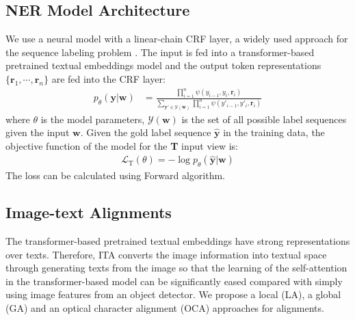 \documentclass[11pt]{article}
\newcommand{\mcL}{\mathcal{L}}
\def\vr{{\bm{r}}}
\def\vw{{\bm{w}}}
\def\vy{{\bm{y}}}
\begin{document}
\subsection{NER Model Architecture}
We use a neural model with a linear-chain CRF layer, a widely used approach for the sequence labeling problem \citep{Huang2015BidirectionalLM,akbik-etal-2018-contextual,devlin-etal-2019-bert}. The input is fed into a transformer-based pretrained textual embeddings model and the output token representations $\{\vr_1, \cdots, \vr_n\}$ are fed into the CRF layer:
\begin{align}
    p_\theta(\vy|\vw) &= \frac{\prod\limits_{i=1}^{n} \psi(y_{i-1}, y_i, \vr_i)}{\sum\limits_{\vy' \in \mathcal{Y}(\vw)} \prod\limits_{i=1}^{n} \psi(y'_{i-1}, y'_i, \vr_i)}\nonumber
\end{align}
where $\theta$ is the model parameters, $\mathcal{Y}(\vw)$ is the set of all possible label sequences given the input $\vw$. Given the gold label sequence $\hat{\vy}$ in the training data, the objective function of the model for the \textbf{T} input view is:
\begin{align}
\mcL_\text{T}(\theta) = - \log p_\theta(\hat{\vy}|\vw) \label{eq:nll_loss}
\end{align}
The loss can be calculated using Forward algorithm.


\subsection{Image-text Alignments}
The transformer-based pretrained textual embeddings have strong representations over texts. Therefore, ITA converts the image information into textual space through generating texts from the image so that the learning of the self-attention in the transformer-based model can be significantly eased compared with simply using image features from an object detector. We propose a local (LA), a global (GA) and an optical character alignment (OCA) approaches for alignments.
\end{document}
